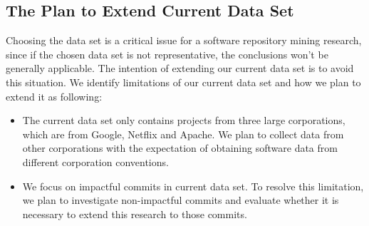 \subsection{The Plan to Extend Current Data Set}

Choosing the data set is a critical issue for a software repository mining research, since if the chosen data set is not representative, the conclusions won't be generally applicable.
The intention of extending our current data set is to avoid this situation.
We identify limitations of our current data set and how we plan to extend it as following:
\begin{itemize}
    \item The current data set only contains projects from three large corporations, which are from Google, Netflix and Apache. We plan to collect data from other corporations with the expectation of obtaining software data from different corporation conventions.
    \item We focus on impactful commits in current data set. To resolve this limitation, we plan to investigate non-impactful commits and evaluate whether it is necessary to extend this research to those commits.
\end{itemize}

